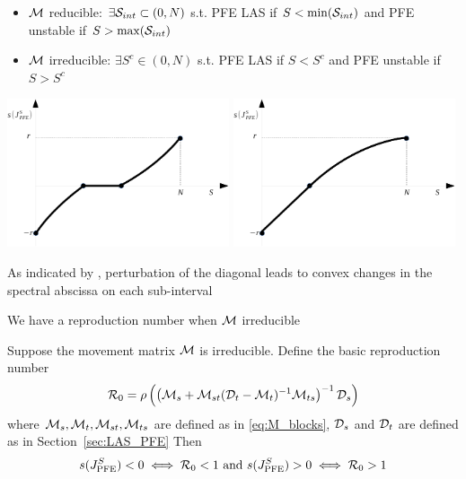 \documentclass[aspectratio=169]{beamer}
\begin{document}
\begin{frame}
	\begin{itemize}
		\item $\M$ reducible: $\exists \S_{int}\subset(0,N)$ s.t. PFE LAS if $S<\min(\S_{int})$ and PFE unstable if $S>\max(\S_{int})$
		\item $\M$ irreducible: $\exists S^c\in(0,N)$ s.t. PFE LAS if $S<S^c$ and PFE unstable if $S>S^c$
	\end{itemize}
	\vfill
	\begin{center}
		\includegraphics[width=0.49\textwidth]{FIGS/bifurcation_case_interval}
		\includegraphics[width=0.49\textwidth]{FIGS/bifurcation_case_unique}
	\end{center}
\end{frame}


\begin{frame}
	As indicated by \cite{DeutschNeumann1985}, perturbation of the diagonal leads to convex changes in the spectral abscissa on each sub-interval
\end{frame}


\begin{frame}{We have a reproduction number when $\M$ irreducible}
	\begin{proposition}\label{prop:R0}
		Suppose the movement matrix $\M$ is irreducible. 
		Define the basic reproduction number
		\begin{equation}\label{eq:R0}
			\R_0 = \rho\left(
			\left(\M_s+\M_{st}(\D_t-\M_{t})^{-1}\M_{ts}\right)^{-1}\D_s
			\right)
		\end{equation}
		where $\M_s,\M_t,\M_{st},\M_{ts}$ are defined as in \eqref{eq:M_blocks}, $\D_s$ and $\D_t$ are defined as in Section~\ref{sec:LAS_PFE}
		Then
		\begin{equation}
			s(J_{\textrm{PFE}}^S)<0 \iff \R_0<1 \textrm{ and }
			s(J_{\textrm{PFE}}^S)>0 \iff \R_0>1
		\end{equation}
	\end{proposition}
\end{frame}
\end{document}
